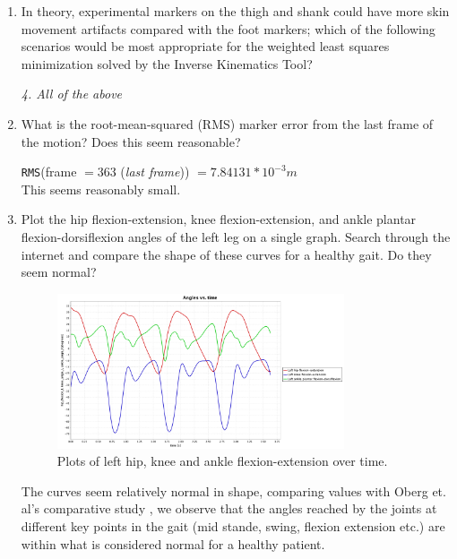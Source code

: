 \documentclass[11pt]{article}
\begin{document}
\begin{enumerate}
\begin{adjustwidth}{0.5cm}{}
\begin{center}
        \end{center}
        The \textit{B} pose-marker combination yields the smallest error.
    \end{adjustwidth}
    \item In theory, experimental markers on the thigh and shank could have more skin movement artifacts compared with the foot markers; which of the following scenarios would be most appropriate for the weighted least squares minimization solved by the Inverse Kinematics Tool?
    \begin{adjustwidth}{0.5cm}{}
        \textit{4. All of the above}
    \end{adjustwidth}
    \item What is the root-mean-squared (RMS) marker error from the last frame of the motion? Does this seem reasonable?
    \begin{adjustwidth}{0.5cm}{}
        \texttt{RMS}(frame $= 363$ (\textit{last frame})) $= 7.84131 * 10^{-3}m$\\
        This seems reasonably small.
    \end{adjustwidth}
    \item Plot the hip flexion-extension, knee flexion-extension, and ankle plantar flexion-dorsiflexion angles of the left leg on a single graph. Search through the internet and compare the shape of these curves for a healthy gait. Do they seem normal?
    \begin{adjustwidth}{0.5cm}{}
        \begin{figure}[h!]
            \centering
            \includegraphics[width=0.8\textwidth]{screens/flexion_extension.jpg}
            \caption{Plots of left hip, knee and ankle flexion-extension over time.}
        \end{figure}
        The curves seem relatively normal in shape, comparing values with Oberg et. al's comparative study \cite{1}, we observe that the angles reached by the joints at different key points in the gait (mid stande, swing, flexion extension etc.) are within what is considered normal for a healthy patient.

\end{adjustwidth}
\end{enumerate}
\end{document}
